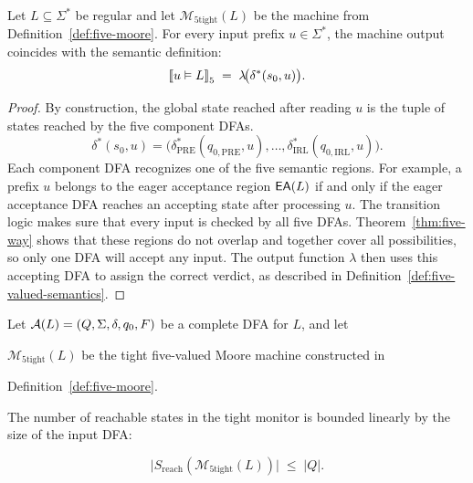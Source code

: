 \begin{lemma}\label{prop:five-moore-correct}
Let $L\subseteq\Sigma^*$ be regular and let $\mathcal{M}_{\text{5tight}}(L)$ be the machine from Definition~\ref{def:five-moore}. For every input prefix $u\in\Sigma^*$, the machine output coincides with the semantic definition:
\[
\left\llbracket u \vDash L \right\rrbracket_{5}\;=\;\lambda\!\big(\delta^{*}(s_0,u)\big).
\]
\end{lemma}

\begin{proof}
By construction, the global state reached after reading $u$ is the tuple of states reached by the five component DFAs.
\[
\delta^{*}(s_0,u)
=\big(\delta_{\mathrm{PRE}}^{*}(q_{0,\mathrm{PRE}},u),\dots,\delta_{\mathrm{IRL}}^{*}(q_{0,\mathrm{IRL}},u)\big).
\]
Each component DFA recognizes one of the five semantic regions. For example, a prefix $u$ belongs to the eager acceptance region $\mathsf{EA}\!\left(L\right)$ if and only if the eager acceptance DFA reaches an accepting state after processing $u$. The transition logic makes sure that every input is checked by all five DFAs. Theorem~\ref{thm:five-way} shows that these regions do not overlap and together cover all possibilities, so only one DFA will accept any input. The output function $\lambda$ then uses this accepting DFA to assign the correct verdict, as described in Definition~\ref{def:five-valued-semantics}.
\end{proof}

\begin{theorem}\label{thm:moore-linear}

  Let $\mathcal{A}(L)=(Q,\Sigma,\delta,q_0,F)$ be a complete DFA for $L$, and let

  $\mathcal{M}_{\text{5tight}}(L)$ be the tight five-valued Moore machine constructed in

  Definition~\ref{def:five-moore}.

  The number of reachable states in the tight monitor is bounded linearly by the size of the input DFA:

  \[
    \bigl|S_{\mathrm{reach}}(\mathcal{M}_{\text{5tight}}(L))\bigr| \;\le\; |Q|.
  \]

\end{theorem}

